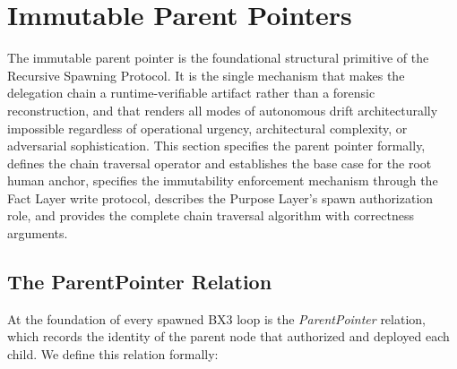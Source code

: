 \section{Immutable Parent Pointers}
\label{sec:immutable-parent-pointers}

The immutable parent pointer is the foundational structural primitive of the Recursive Spawning Protocol. It is the single mechanism that makes the delegation chain a runtime-verifiable artifact rather than a forensic reconstruction, and that renders all modes of autonomous drift architecturally impossible regardless of operational urgency, architectural complexity, or adversarial sophistication. This section specifies the parent pointer formally, defines the chain traversal operator and establishes the base case for the root human anchor, specifies the immutability enforcement mechanism through the Fact Layer write protocol, describes the Purpose Layer's spawn authorization role, and provides the complete chain traversal algorithm with correctness arguments.

\subsection{The ParentPointer Relation}

At the foundation of every spawned BX3 loop is the \textit{ParentPointer} relation, which records the identity of the parent node that authorized and deployed each child. We define this relation formally:

